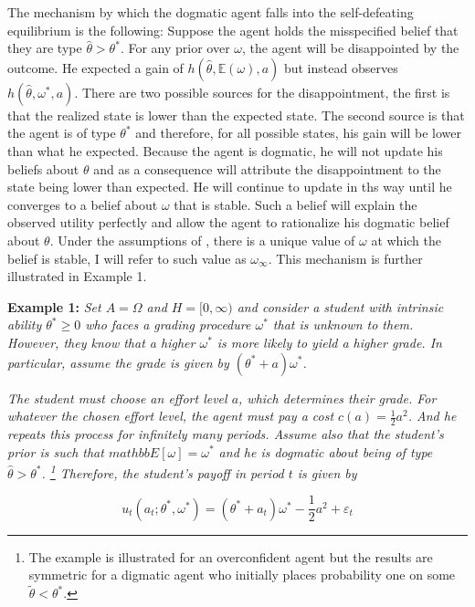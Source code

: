 \documentclass[
  12pt,
]{article}
\begin{document}
The mechanism by which the dogmatic agent falls into the self-defeating
equilibrium is the following: Suppose the agent holds the misspecified
belief that they are type \(\hat{\theta}>\theta^*\). For any prior over
\(\omega\), the agent will be disappointed by the outcome. He expected a
gain of \(h(\hat{\theta}, \mathbb{E}(\omega), a)\) but instead observes
\(h(\hat{\theta}, \omega^*, a)\). There are two possible sources for the
disappointment, the first is that the realized state is lower than the
expected state. The second source is that the agent is of type
\(\theta^*\) and therefore, for all possible states, his gain will be
lower than what he expected. Because the agent is dogmatic, he will not
update his beliefs about \(\theta\) and as a consequence will attribute
the disappointment to the state being lower than expected. He will
continue to update in ths way until he converges to a belief about
\(\omega\) that is stable. Such a belief will explain the observed
utility perfectly and allow the agent to rationalize his dogmatic belief
about \(\theta\). Under the assumptions of \citet{Heidhues2018}, there
is a unique value of \(\omega\) at which the belief is stable, I will
refer to such value as \(\omega_\infty\). This mechanism is further
illustrated in Example 1.

\textbf{Example 1: } \emph{Set \(A = \Omega\) and \(H = [0, \infty)\)
and consider a student with intrinsic ability \(\theta^*\geq 0\) who
faces a grading procedure \(\omega^*\) that is unknown to them. However,
they know that a higher \(\omega^*\) is more likely to yield a higher
grade. In particular, assume the grade is given by
\((\theta^*+a)\omega^*\).}

\emph{The student must choose an effort level \(a\), which determines
their grade. For whatever the chosen effort level, the agent must pay a
cost \(c(a) = \frac{1}{2}a^2\). And he repeats this process for
infinitely many periods. Assume also that the student's prior is such
that \(mathbb{E}[\omega]= \omega^*\) and he is dogmatic about being of
type \(\hat{\theta}>\theta^*\).
\footnote{The example is illustrated for an overconfident agent but the results are symmetric for a digmatic agent who initially 
places probability one on some $\tilde{\theta}<\theta^*$.} Therefore,
the student's payoff in period \(t\) is given by }

\begin{equation}
u_t(a_t; \theta^*, \omega^*) = (\theta^*+a_t)\omega^* - \frac{1}{2}a^2 + \varepsilon_t
\end{equation}
\end{document}
